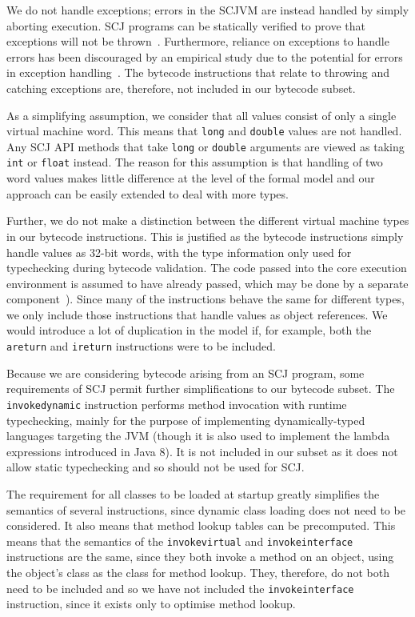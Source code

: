 We do not handle exceptions; errors in the SCJVM are instead handled
by simply aborting execution.
SCJ programs can be statically verified to prove that exceptions will
not be thrown~\cite{kalibera2010,marriott2014}.
Furthermore, reliance on exceptions to handle errors has been
discouraged by an empirical study due to the potential for errors in
exception handling~\cite{sawadpong2012}.
The bytecode instructions that relate to throwing and catching
exceptions are, therefore, not included in our bytecode subset.

As a simplifying assumption, we consider that all values consist of
only a single virtual machine word.
This means that \texttt{long} and \texttt{double} values are not
handled.
Any SCJ API methods that take \texttt{long} or \texttt{double}
arguments are viewed as taking \texttt{int} or \texttt{float} instead.
The reason for this assumption is that handling of two word values
makes little difference at the level of the formal model and our
approach can be easily extended to deal with more types.

Further, we do not make a distinction between the different virtual
machine types in our bytecode instructions.
This is justified as the bytecode instructions simply handle values as
32-bit words, with the type information only used for typechecking
during bytecode validation. 
The code passed into the core execution environment is assumed to have
already passed, which may be done by a separate
component~\cite{klein2003, stark2001, coglio2000, xavier2003}). 
Since many of the instructions behave the same for different types, we
only include those instructions that handle values as object
references.
We would introduce a lot of duplication in the model if, for example,
both the \texttt{areturn} and \texttt{ireturn} instructions were to be
included.

Because we are considering bytecode arising from an SCJ program, some
requirements of SCJ permit further simplifications to our bytecode
subset.
The \texttt{invokedynamic} instruction performs method invocation with
runtime typechecking, mainly for the purpose of implementing
dynamically-typed languages targeting the JVM (though it is also used
to implement the lambda expressions introduced in Java 8).
It is not included in our subset as it does not allow static
typechecking and so should not be used for SCJ.

The requirement for all classes to be loaded at startup greatly
simplifies the semantics of several instructions, since dynamic class
loading does not need to be considered.
It also means that method lookup tables can be precomputed.
This means that the semantics of the \texttt{invokevirtual} and
\texttt{invokeinterface} instructions are the same, since they both
invoke a method on an object, using the object's class as the class
for method lookup.
They, therefore, do not both need to be included and so we have not
included the \texttt{invokeinterface} instruction, since it exists
only to optimise method lookup.

